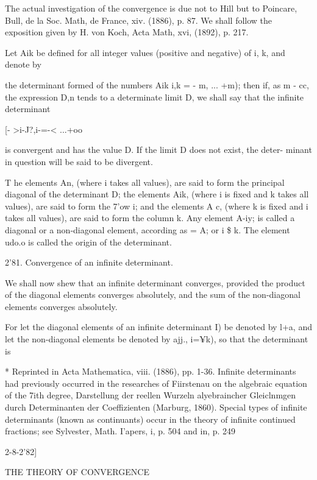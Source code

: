 The actual investigation of the convergence is due not to Hill but to
Poincare, Bull, de la Soc. Math, de France, xiv. (1886), p. 87. We
shall follow the exposition given by H. von Koch, Acta Math, xvi,
(1892), p. 217.

Let Aik be defined for all integer values (positive and negative) of
i, k, and denote by

the determinant formed of the numbers Aik i,k = - m, ... +m); then if,
as m - cc, the expression D,n tends to a determinate limit D, we
shall say that the infinite determinant

[- >i-J?,i-=-< ...+oo

is convergent and has the value D. If the limit D does not exist, the
deter- minant in question will be said to be divergent.

T he elements An, (where i takes all values), are said to form the
principal diagonal of the determinant D; the elements Aik, (where i is
fixed and k takes all values), are said to form the 7'ow i; and the
elements A c, (where k is fixed and i takes all values), are said to
form the column k. Any element A-iy; is called a diagonal or a
non-diagonal element, according as = A; or i \$ k. The element udo.o
is called the origin of the determinant.

2'81. Convergence of an infinite determinant.

We shall now shew that an infinite determinant converges, provided the
product of the diagonal elements converges absolutely, and the sum of
the non-diagonal elements converges absolutely.

For let the diagonal elements of an infinite determinant I) be denoted
by l+a, and let the non-diagonal elements be denoted by ajj., i=¥k),
so that the determinant is

* Reprinted in Acta Mathematica, viii. (1886), pp. 1-36. Infinite
determinants had previously occurred in the researches of Fiirstenau
on the algebraic equation of the 7ith degree, Darstellung der reellen
Wurzeln alyebraincher Gleiclnmgen durch Determinanten der
Coeffizienten (Marburg, 1860). Special types of infinite determinants
(known as continuants) occur in the theory of infinite continued
fractions; see Sylvester, Math. I'apers, i, p. 504 and in, p. 249



2-8-2'82]



THE THEORY OF CONVERGENCE



